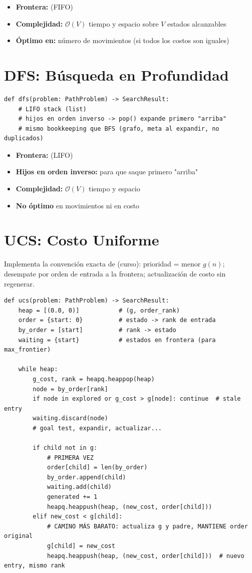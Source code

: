 \begin{itemize}
\item \textbf{Frontera:}  (FIFO)
\item \textbf{Complejidad:} $\mathcal{O}(V)$ tiempo y espacio sobre $V$ estados alcanzables
\item \textbf{Óptimo en:} número de movimientos (si todos los costos son iguales)
\end{itemize}

\section{DFS: Búsqueda en Profundidad}
\label{sec:dfs}

\begin{verbatim}
def dfs(problem: PathProblem) -> SearchResult:
    # LIFO stack (list)
    # hijos en orden inverso -> pop() expande primero "arriba"
    # mismo bookkeeping que BFS (grafo, meta al expandir, no duplicados)
\end{verbatim}

\begin{itemize}
\item \textbf{Frontera:}  (LIFO)
\item \textbf{Hijos en orden inverso:} para que  saque primero "arriba"
\item \textbf{Complejidad:} $\mathcal{O}(V)$ tiempo y espacio
\item \textbf{No óptimo} en movimientos ni en costo
\end{itemize}

\section{UCS: Costo Uniforme}
\label{sec:ucs}

Implementa la convención exacta de  (curso): prioridad = menor $g(n)$; desempate por
orden de entrada a la frontera; actualización de costo sin regenerar.

\begin{verbatim}
def ucs(problem: PathProblem) -> SearchResult:
    heap = [(0.0, 0)]           # (g, order_rank)
    order = {start: 0}          # estado -> rank de entrada
    by_order = [start]          # rank -> estado
    waiting = {start}           # estados en frontera (para max_frontier)
    
    while heap:
        g_cost, rank = heapq.heappop(heap)
        node = by_order[rank]
        if node in explored or g_cost > g[node]: continue  # stale entry
        waiting.discard(node)
        # goal test, expandir, actualizar...
        
        if child not in g:
            # PRIMERA VEZ
            order[child] = len(by_order)
            by_order.append(child)
            waiting.add(child)
            generated += 1
            heapq.heappush(heap, (new_cost, order[child]))
        elif new_cost < g[child]:
            # CAMINO MÁS BARATO: actualiza g y padre, MANTIENE order original
            g[child] = new_cost
            heapq.heappush(heap, (new_cost, order[child]))  # nuevo entry, mismo rank
\end{verbatim}

